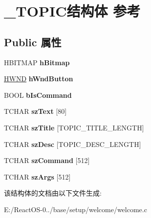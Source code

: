 \hypertarget{struct___t_o_p_i_c}{}\section{\+\_\+\+T\+O\+P\+I\+C结构体 参考}
\label{struct___t_o_p_i_c}
\subsection*{Public 属性}
\begin{DoxyCompactItemize}
\item 
\mbox{\label{struct___t_o_p_i_c_ab340a6c09b9f31a4ffe968346fae82c4}} 
H\+B\+I\+T\+M\+AP {\bfseries h\+Bitmap}
\item 
\mbox{\label{struct___t_o_p_i_c_a6517884ad543171a1037dc7c0cf9378d}} 
\hyperlink{interfacevoid}{H\+W\+ND} {\bfseries h\+Wnd\+Button}
\item 
\mbox{\label{struct___t_o_p_i_c_ad4c19727cf3ec27cf3a894432a673e27}} 
B\+O\+OL {\bfseries b\+Is\+Command}
\item 
\mbox{\label{struct___t_o_p_i_c_ac3604b8246f52b7787590e4c990d1872}} 
T\+C\+H\+AR {\bfseries sz\+Text} \mbox{[}80\mbox{]}
\item 
\mbox{\label{struct___t_o_p_i_c_a67343badf4bd5843c034d10c300ca31c}} 
T\+C\+H\+AR {\bfseries sz\+Title} \mbox{[}T\+O\+P\+I\+C\+\_\+\+T\+I\+T\+L\+E\+\_\+\+L\+E\+N\+G\+TH\mbox{]}
\item 
\mbox{\label{struct___t_o_p_i_c_af47edcda9dd2efa7d6f59cfecc34bc51}} 
T\+C\+H\+AR {\bfseries sz\+Desc} \mbox{[}T\+O\+P\+I\+C\+\_\+\+D\+E\+S\+C\+\_\+\+L\+E\+N\+G\+TH\mbox{]}
\item 
\mbox{\label{struct___t_o_p_i_c_a85e7fe21173cb2ec5d847209a59283bb}} 
T\+C\+H\+AR {\bfseries sz\+Command} \mbox{[}512\mbox{]}
\item 
\mbox{\label{struct___t_o_p_i_c_a4fb95bf1374d9e2a82f09e0b6150611d}} 
T\+C\+H\+AR {\bfseries sz\+Args} \mbox{[}512\mbox{]}
\end{DoxyCompactItemize}


该结构体的文档由以下文件生成\+:\begin{DoxyCompactItemize}
\item 
E\+:/\+React\+O\+S-\/0../base/setup/welcome/welcome.\+c\end{DoxyCompactItemize}
